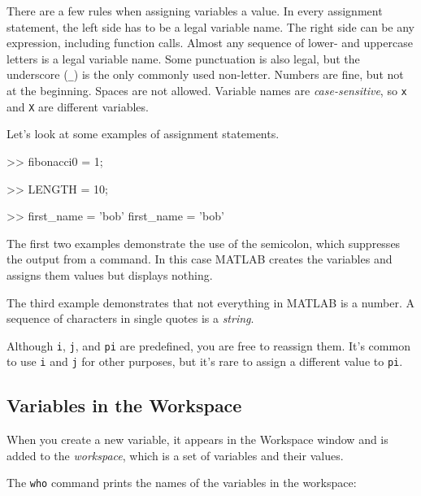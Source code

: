 
There are a few rules when assigning variables a value. In every assignment statement, the left side has to be a legal variable name.  The right side can be any expression, including function calls.
%
%
%
%
Almost any sequence of lower- and uppercase letters is a legal
variable name.
Some punctuation is also legal, but the underscore (\lstinline{_}) is the only commonly used non-letter.
Numbers are fine, but not at the beginning.
Spaces are not allowed.  Variable names are
\emph{case-sensitive}, so \lstinline{x} and \lstinline{X} are different variables.

Let's look at some examples of assignment statements.

\begin{code}
>> fibonacci0 = 1;

>> LENGTH = 10;

>> first_name = 'bob'
first_name = 'bob'
\end{code}

The first two examples demonstrate the use of the semicolon, which
suppresses the output from a command.  In this case MATLAB creates the
variables and assigns them values but displays nothing.
%
%
%
%

The third example demonstrates that not everything
in MATLAB is a number.
A sequence of characters in single quotes is
a \emph{string}.


Although \lstinline{i}, \lstinline{j}, and \lstinline{pi} are predefined, you are free
to reassign them.  It's common to use \lstinline{i} and \lstinline{j} for other
purposes, but it's rare to assign a different value to
\lstinline{pi}.



\subsection{Variables in the Workspace}

When you create a new variable, it appears in the Workspace window and is added to the \emph{workspace}, which is a
set of variables and their values.


The \lstinline{who} command prints the
names of the variables in the workspace:

